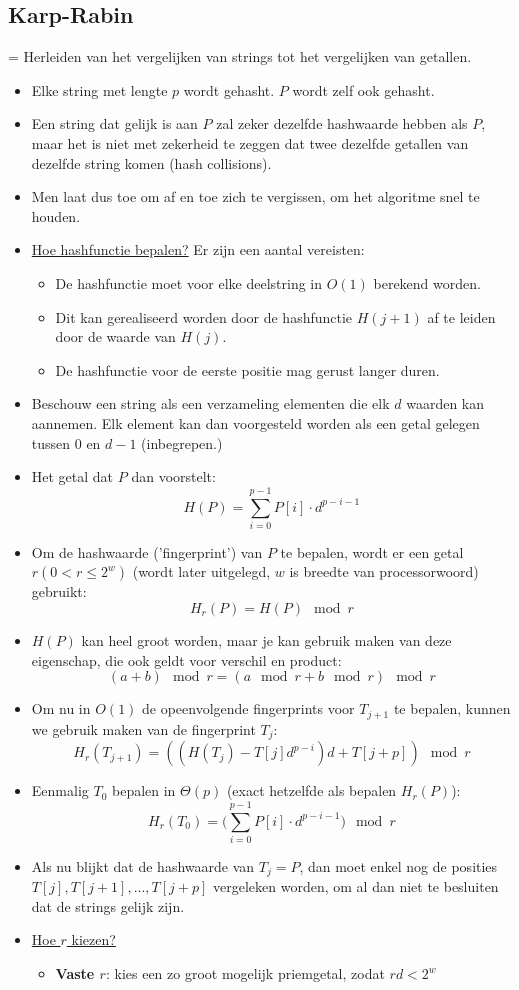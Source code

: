 \documentclass{report}
\begin{document}
\subsection{Karp-Rabin}
= Herleiden van het vergelijken van strings tot het vergelijken van getallen.
\begin{itemize}
	\item[\info] Elke string met lengte $p$ wordt gehasht. $P$ wordt zelf ook gehasht.
	\item[\info] Een string dat gelijk is aan $P$ zal zeker dezelfde hashwaarde hebben als $P$, maar het is niet met zekerheid te zeggen dat twee dezelfde getallen van dezelfde string komen (hash collisions).
	\item[\alert] Men laat dus toe om af en toe zich te vergissen, om het algoritme snel te houden.
	\item[\info] \underline{Hoe hashfunctie bepalen?} Er zijn een aantal vereisten:
	\begin{itemize}
		\item[\info] De hashfunctie moet voor elke deelstring in $O(1)$ berekend worden. 
		\item[\info] Dit kan gerealiseerd worden door de hashfunctie $H(j + 1)$ af te leiden door de waarde van $H(j)$.
		\item[\info] De hashfunctie voor de eerste positie mag gerust langer duren.
	\end{itemize}
	\item[\info] Beschouw een string als een verzameling elementen die elk $d$ waarden kan aannemen. Elk element kan dan voorgesteld worden als een getal gelegen tussen 0 en $d - 1$ (inbegrepen.)
	\item[\info] Het getal dat $P$ dan voorstelt:
	$$H(P) = \sum_{i = 0}^{p-1} P[i]\cdot d^{p - i - 1}$$
	\item[\info] Om de hashwaarde ('fingerprint') van $P$ te bepalen, wordt er een getal $r (0 < r \leq 2^w)$ (wordt  later uitgelegd, $w$ is breedte van processorwoord) gebruikt:
	$$H_r(P) = H(P)\mod r$$
	\item[\info] $H(P)$ kan heel groot worden, maar je kan gebruik maken van deze eigenschap, die ook geldt voor verschil en product:
	$$(a + b) \mod r = (a \mod r + b \mod r) \mod r$$
	\item[\info] Om nu in $O(1)$ de opeenvolgende fingerprints voor $T_{j + 1}$ te bepalen, kunnen we gebruik maken van de fingerprint $T_{j}$:
	$$H_r(T_{j + 1}) = ((H(T_j) - T[j]d^{p - i})d + T[j + p]) \mod r$$
	\item[\info] Eenmalig $T_0$ bepalen in $\Theta(p)$ (exact hetzelfde als bepalen $H_r(P)$):
	$$H_r(T_0) = \bigg(\sum_{i = 0}^{p-1} P[i]\cdot d^{p - i - 1}\bigg)\mod r$$
	\item[\info] Als nu blijkt dat de hashwaarde van $T_{j} = P$, dan moet enkel nog de posities $T[j], T[j + 1], ..., T[j + p]$ vergeleken worden, om al dan niet te besluiten dat de strings gelijk zijn.
	\item[\info] \underline{Hoe $r$ kiezen?}
	\begin{itemize}
		\item \textbf{Vaste $r$}: kies een zo groot mogelijk priemgetal, zodat $rd < 2^w$


\end{itemize}
\end{itemize}
\end{document}
